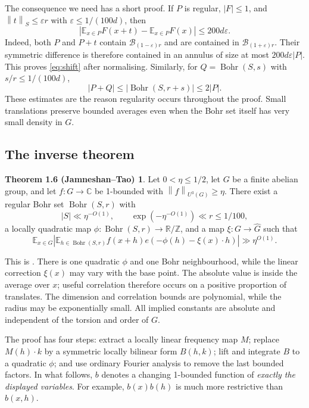 \documentclass[11pt,a4paper]{article}
\newcommand{\E}{\mathbb E}
\newcommand{\T}{\mathbb R/\mathbb Z}
\newcommand{\C}{\mathbb C}
\newcommand{\Gh}{\widehat G}
\newcommand{\Bohr}{\operatorname{Bohr}}
\newcommand{\bb}{\mathcal B}
\newcommand{\abs}[1]{\left|#1\right|}
\newcommand{\norm}[1]{\left\|#1\right\|}
\newcommand{\JT}[1]{\cite[#1]{JT}}
\theoremstyle{definition}
\newtheorem*{inverse}{Theorem 1.6 (Jamneshan--Tao)}
\numberwithin{equation}{section}
\begin{document}
The consequence we need has a short proof. If $P$ is regular,
$|F|\leq1$, and $\norm{t}_S\leq\varepsilon r$ with
$\varepsilon\leq1/(100d)$, then
\begin{equation}\label{eq:shift}
\abs{\E_{x\in P}F(x+t)-\E_{x\in P}F(x)}\leq200d\varepsilon.
\end{equation}
Indeed, both $P$ and $P+t$ contain $\bb_{(1-\varepsilon)r}$ and are
contained in $\bb_{(1+\varepsilon)r}$. Their symmetric difference is
therefore contained in an annulus of size at most
$200d\varepsilon|P|$. This proves \eqref{eq:shift} after normalising.
Similarly, for $Q=\Bohr(S,s)$ with $s/r\leq1/(100d)$,
\begin{equation}\label{eq:sumset-ratio}
|P+Q|\leq|\Bohr(S,r+s)|\leq2|P|.
\end{equation}
These estimates are the reason regularity occurs throughout the proof.
Small translations preserve bounded averages even when the Bohr set
itself has very small density in $G$.

\subsection{The inverse theorem}
\begin{inverse}
Let $0<\eta\leq1/2$, let $G$ be a finite abelian group, and let
$f:G\to\C$ be 1-bounded with $\norm{f}_{U^3(G)}\geq\eta$.
There exist a regular Bohr set $\Bohr(S,r)$ with
\[
|S|\ll\eta^{-O(1)},\qquad
\exp(-\eta^{-O(1)})\ll r\leq1/100,
\]
a locally quadratic map $\phi:\Bohr(S,r)\to\T$, and a map
$\xi:G\to\Gh$ such that
\begin{equation}\label{eq:target}
\E_{x\in G}\abs{\E_{h\in\Bohr(S,r)}
f(x+h)e(-\phi(h)-\xi(x)\cdot h)}\gg\eta^{O(1)}.
\end{equation}
\end{inverse}
This is \JT{Theorem 1.6}. There is one quadratic $\phi$ and one Bohr
neighbourhood, while the linear correction $\xi(x)$ may vary with the
base point. The absolute value is inside the average over $x$; useful
correlation therefore occurs on a positive proportion of translates.
The dimension and correlation bounds are polynomial, while the radius
may be exponentially small. All implied constants are absolute and
independent of the torsion and order of $G$.

The proof has four steps: extract a locally linear frequency map $M$;
replace $M(h)\cdot k$ by a symmetric locally bilinear form $B(h,k)$;
lift and integrate $B$ to a quadratic $\phi$; and use ordinary Fourier
analysis to remove the last bounded factors. In what follows, $b$ denotes
a changing 1-bounded function of \emph{exactly the displayed variables}.
For example, $b(x)b(h)$ is much more restrictive than $b(x,h)$.
\end{document}
